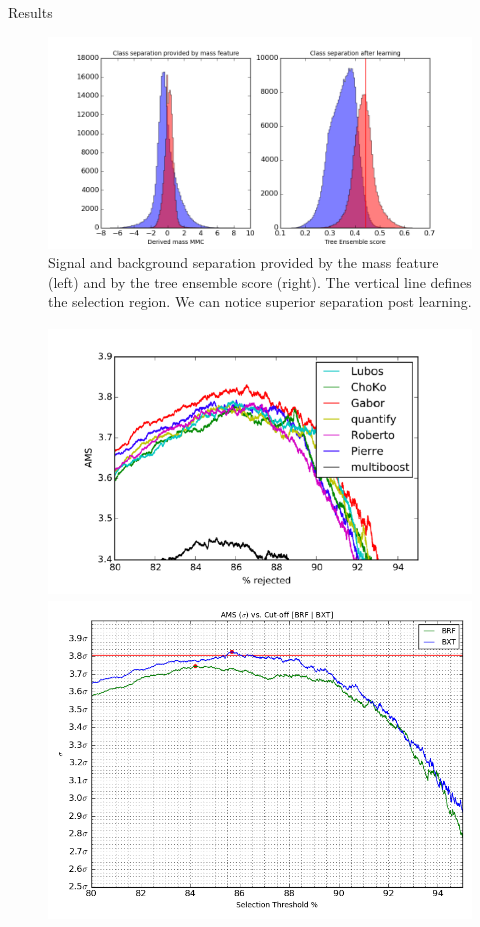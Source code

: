 \documentclass[final]{beamer}
\begin{document}
\begin{frame}{}
\begin{textblock}{20}
\begin{block}{Results}
\begin{figure}
\begin{minipage}{0.95\textwidth}
\centering
\includegraphics[scale=0.65]{separation.png}
\caption{\tiny{Signal and background separation provided by the mass feature (left) and by the tree ensemble score (right). The vertical line defines the selection region. We can notice superior separation post learning.}}
\end{minipage}
\end{figure}
\vspace{-8mm}
\begin{figure}
\begin{minipage}{0.95\textwidth}
\centering
\includegraphics[width=0.5\linewidth, height=203pt]{WinningAMS.png}
\includegraphics[width=0.5\linewidth]{AMS_Curve_BXT_BRF.png}

\end{minipage}
\end{figure}
\end{block}
\end{textblock}
\end{frame}
\end{document}
